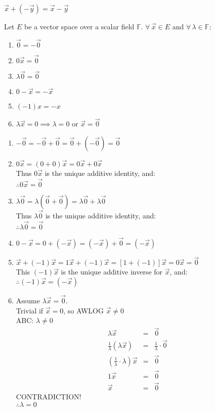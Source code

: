 \documentclass[letterpaper,12pt,fleqn]{article}
\newcommand{\F}{\mathbb{F}}
\renewcommand{\l}{\lambda}
\newcommand{\vx}{\vec{x}}
\newcommand{\vy}{\vec{y}}
\newcommand{\vo}{\vec{0}}
\begin{document}
\begin{notation}
$\vx+(-\vy)=\vx-\vy$
\end{notation}

\begin{theorem}
  Let $E$ be a vector space over a scalar field $\F$.
  $\forall\,\vx\in E$ and $\forall\,\l\in\F$:
  \begin{enumerate}
  \item $\vo=-\vo$
  \item $0\vx=\vo$
  \item $\l\vo=\vo$
  \item $0-\vx=-\vx$
  \item $(-1)x=-x$
  \item $\l\vx=0\implies\l=0$ or $\vx=\vo$
  \end{enumerate}
\end{theorem}

\begin{theproof}
  \listbreak
  \begin{enumerate}
  \item
    $-\vo=-\vo+\vo=\vo+(-\vo)=\vo$

  \item
    $0\vx=(0+0)\vx=0\vx+0\vx$ \\
    Thus $0\vx$ is the unique additive identity, and: \\
    $\therefore0\vx=\vo$

  \item
    $\l\vo=\l(\vo+\vo)=\l\vo+\l\vo$ \\
    Thus $\l\vo$ is the unique additive identity, and: \\
    $\therefore\l\vo=\vo$

  \item
    $0-\vx=0+(-\vx)=(-\vx)+\vo=(-\vx)$

  \item
    $\vx+(-1)\vx=1\vx+(-1)\vx=[1+(-1)]\vx=0\vx=\vo$ \\
    This $(-1)\vx$ is the unique additive inverse for $\vx$, and: \\
    $\therefore(-1)\vx=(-\vx)$

  \item Assume $\l\vx=\vo$. \\
    Trivial if $\vx=0$, so AWLOG $\vx\ne0$ \\
    ABC: $\l\ne0$
    \begin{eqnarray*}
      \l\vx &=& \vo \\
      \frac{1}{\l}(\l\vx) &=& \frac{1}{\l}\cdot\vo \\
      (\frac{1}{\l}\cdot\l)\vx &=& \vo \\
      1\vx &=& \vo \\
      \vx &=& \vo
    \end{eqnarray*}
    CONTRADICTION! \\
    $\therefore\l=0$
  \end{enumerate}
\end{theproof}
\end{document}
